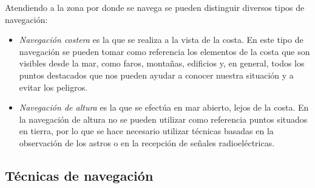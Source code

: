 
Atendiendo a la zona por donde se navega se pueden distinguir diversos tipos de navegación: 
\begin{itemize}
\item \emph{Navegación costera} es la que se realiza a la vista de la costa. En este tipo de navegación se pueden tomar como referencia los elementos de la costa que son visibles desde la mar, como faros, montañas, edificios y, en general, todos los puntos destacados que nos pueden ayudar a conocer nuestra situación y a evitar los peligros. 
\item  \emph{Navegación de altura} es la que se efectúa en mar abierto, lejos de la costa. En la navegación de altura no se pueden utilizar como referencia puntos situados en tierra, por lo que se hace necesario utilizar técnicas basadas en la observación de los astros o en la recepción de señales radioeléctricas.
\end{itemize}

\subsection{Técnicas de navegación}


